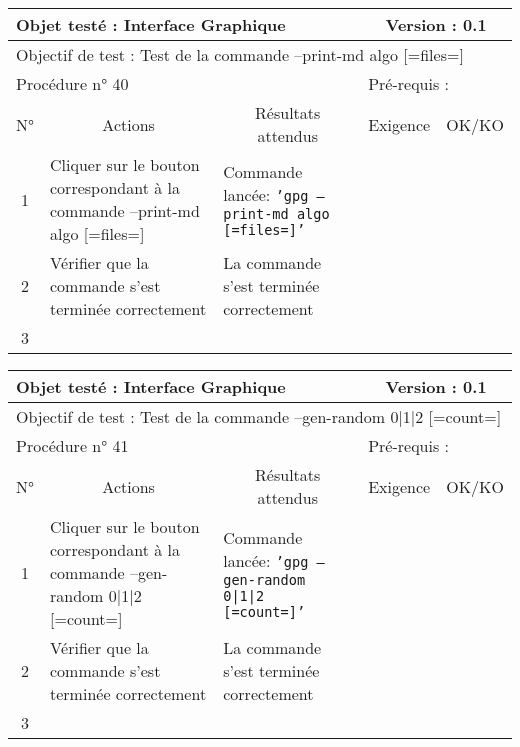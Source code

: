 \documentclass{../res/univ-projet}
\begin{document}
\begin{center}
\begin{tabular}{|c|p{5cm}|p{5cm}|p{1.5cm}|p{1.5cm}|}
\hline
\multicolumn{3}{|l|}{Objet testé : Interface Graphique} & \multicolumn{2}{c|}{Version : 0.1}\\ \hline
\multicolumn{5}{|l|}{Objectif de test : Test de la commande –print-md algo [=files=]}\\ \hline
\multicolumn{3}{|l|}{Procédure n° 40} & \multicolumn{2}{p{3cm}|}{Pré-requis : }\\ \hline
\multicolumn{1}{|c|}{N°} & \multicolumn{1}{c|}{Actions} & \multicolumn{1}{c|}{Résultats attendus} & 
\multicolumn{1}{c|}{Exigence} & \multicolumn{1}{c|}{OK/KO}\\ \hline
1 & Cliquer sur le bouton correspondant à la commande –print-md algo [=files=] & Commande lancée: \texttt{'gpg –print-md algo [=files=]'} &  & \\
2 & Vérifier que la commande s'est terminée correctement & La commande s'est terminée correctement &  & \\
3 &  &  &  & \\ \hline
\end{tabular}
\vskip 2.2cm


\begin{tabular}{|c|p{5cm}|p{5cm}|p{1.5cm}|p{1.5cm}|}
\hline
\multicolumn{3}{|l|}{Objet testé : Interface Graphique} & \multicolumn{2}{c|}{Version : 0.1}\\ \hline
\multicolumn{5}{|l|}{Objectif de test : Test de la commande –gen-random 0|1|2 [=count=]}\\ \hline
\multicolumn{3}{|l|}{Procédure n° 41} & \multicolumn{2}{p{3cm}|}{Pré-requis : }\\ \hline
\multicolumn{1}{|c|}{N°} & \multicolumn{1}{c|}{Actions} & \multicolumn{1}{c|}{Résultats attendus} & 
\multicolumn{1}{c|}{Exigence} & \multicolumn{1}{c|}{OK/KO}\\ \hline
1 & Cliquer sur le bouton correspondant à la commande –gen-random 0|1|2 [=count=] & Commande lancée: \texttt{'gpg –gen-random 0|1|2 [=count=]'} &  & \\
2 & Vérifier que la commande s'est terminée correctement & La commande s'est terminée correctement &  & \\
3 &  &  &  & \\ \hline
\end{tabular}
\vskip 2.2cm



\end{center}
\end{document}
